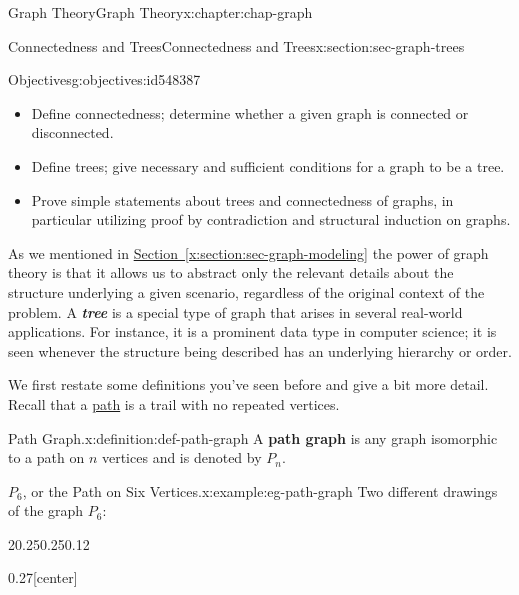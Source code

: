 \documentclass[oneside,10pt,]{book}
\newcommand{\xreffont}{\relax}
\newcommand{\alert}[1]{\textbf{\textit{#1}}}
\newcommand{\terminology}[1]{\textbf{#1}}
\numberwithin{equation}{section}
\begin{document}
\begin{chapterptx}{Graph Theory}{}{Graph Theory}{}{}{x:chapter:chap-graph}
%
%
\typeout{************************************************}
\typeout{************************************************}
%
\begin{sectionptx}{Connectedness and Trees}{}{Connectedness and Trees}{}{}{x:section:sec-graph-trees}
\begin{objectives}{Objectives}{g:objectives:id548387}
%
\begin{itemize}[label=\textbullet]
\item{}Define connectedness; determine whether a given graph is connected or disconnected.%
\item{}Define trees; give necessary and sufficient conditions for a graph to be a tree.%
\item{}Prove simple statements about trees and connectedness of graphs, in particular utilizing proof by contradiction and structural induction on graphs.%
\end{itemize}
\end{objectives}
As we mentioned in \hyperref[x:section:sec-graph-modeling]{Section~{\xreffont\ref{x:section:sec-graph-modeling}}} the power of graph theory is that it allows us to abstract only the relevant details about the structure underlying a given scenario, regardless of the original context of the problem. A \alert{tree} is a special type of graph that arises in several real-world applications. For instance, it is a prominent data type in computer science; it is seen whenever the structure being described has an underlying hierarchy or order.%
\par
We first restate some definitions you've seen before and give a bit more detail. Recall that a \hyperref[x:definition:def-path]{path} is a trail with no repeated vertices.%
\begin{definition}{Path Graph.}{x:definition:def-path-graph}%
A \terminology{path graph} is any graph isomorphic to a path on \(n\) vertices and is denoted by \(P_n\). \label{g:notation:id548453}%
\end{definition}
\begin{example}{\(P_6\), or the Path on Six Vertices.}{x:example:eg-path-graph}%
Two different drawings of the graph \(P_6\):%
\begin{sidebyside}{2}{0.25}{0.25}{0.12}%
\begin{sbspanel}{0.27}[center]%
\end{sbspanel}
\end{sidebyside}
\end{example}
\end{sectionptx}
\end{chapterptx}
\end{document}
